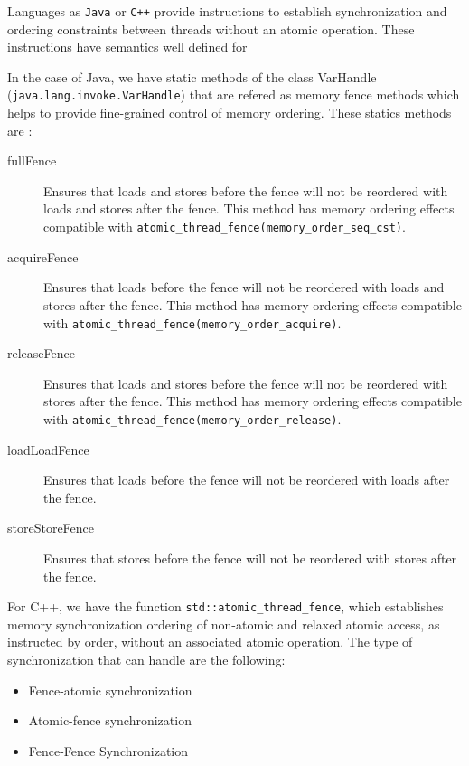 \documentclass[openany, a4paper]{book}
\theoremstyle{break}
\theoremstyle{example}
\theoremstyle{note}
\theoremstyle{break}
\theoremstyle{exercise}
\begin{document}
Languages as \texttt{Java} or \texttt{C++} provide instructions to establish synchronization
and ordering constraints between threads without an atomic operation. These
instructions have semantics well defined for

In the case of Java, we have static methods of the class VarHandle
(\texttt{java.lang.invoke.VarHandle}) that are refered as memory fence methods which
helps to provide fine-grained control of memory ordering. These statics
methods are \cite{varHandleJdk92017}:

\begin{description}
\item[{fullFence}] Ensures that loads and stores before the fence will not be
reordered with loads and stores after the fence. This method has memory
ordering effects compatible with
\texttt{atomic\_thread\_fence(memory\_order\_seq\_cst)}.
\item[{acquireFence}] Ensures that loads before the fence will not be reordered
with loads and stores after the fence. This method has memory ordering
effects compatible with \texttt{atomic\_thread\_fence(memory\_order\_acquire)}.
\item[{releaseFence}] Ensures that loads and stores before the fence will not
be reordered with stores after the fence. This method has memory ordering
effects compatible with \texttt{atomic\_thread\_fence(memory\_order\_release)}.
\item[{loadLoadFence}] Ensures that loads before the fence will not be
reordered with loads after the fence.
\item[{storeStoreFence}] Ensures that stores before the fence will not be
reordered with stores after the fence.
\end{description}

For C++, we have the function
\texttt{std::atomic\_thread\_fence}\cite{threadFenceCpp2020}, which establishes
memory synchronization ordering of non-atomic and relaxed atomic access, as
instructed by order, without an associated atomic operation. The type of
synchronization that can handle are the following:

\begin{itemize}
\item Fence-atomic synchronization
\item Atomic-fence synchronization
\item Fence-Fence Synchronization
\end{itemize}
\end{document}
